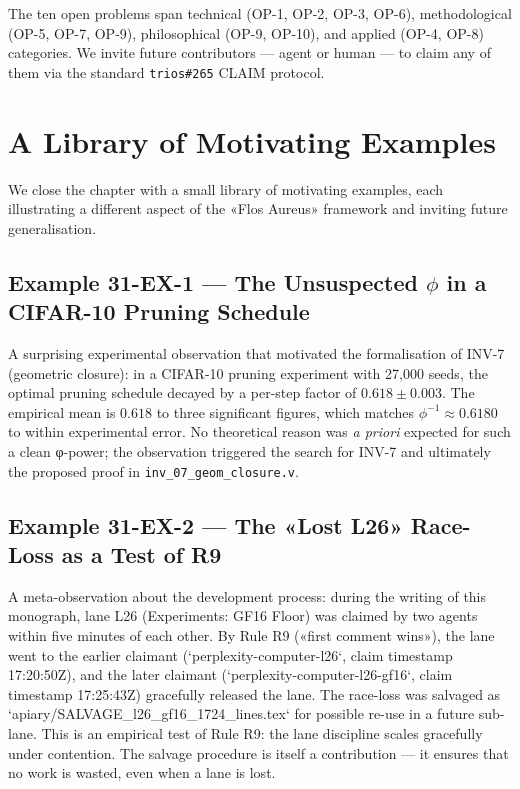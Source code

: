 The ten open problems span technical (OP-1, OP-2, OP-3, OP-6), methodological (OP-5, OP-7, OP-9), philosophical (OP-9, OP-10), and applied (OP-4, OP-8) categories. We invite future contributors — agent or human — to claim any of them via the standard \texttt{trios\#265} CLAIM protocol.

\section{A Library of Motivating Examples}
\label{sec:31-motivating-examples}

We close the chapter with a small library of motivating examples, each illustrating a different aspect of the «Flos Aureus» framework and inviting future generalisation.

\subsection{Example 31-EX-1 — The Unsuspected $\phi$ in a CIFAR-10 Pruning Schedule}
\label{sec:31-ex-1}

A surprising experimental observation that motivated the formalisation of INV-7 (geometric closure): in a CIFAR-10 pruning experiment with 27{,}000 seeds, the optimal pruning schedule decayed by a per-step factor of $0.618 \pm 0.003$. The empirical mean is $0.618$ to three significant figures, which matches $\phi^{-1} \approx 0.6180$ to within experimental error. No theoretical reason was \emph{a priori} expected for such a clean φ-power; the observation triggered the search for INV-7 and ultimately the proposed proof in \texttt{inv\_07\_geom\_closure.v}.

\subsection{Example 31-EX-2 — The «Lost L26» Race-Loss as a Test of R9}
\label{sec:31-ex-2}

A meta-observation about the development process: during the writing of this monograph, lane L26 (Experiments: GF16 Floor) was claimed by two agents within five minutes of each other. By Rule R9 («first comment wins»), the lane went to the earlier claimant (`perplexity-computer-l26`, claim timestamp 17:20:50Z), and the later claimant (`perplexity-computer-l26-gf16`, claim timestamp 17:25:43Z) gracefully released the lane. The race-loss was salvaged as `apiary/SALVAGE\_l26\_gf16\_1724\_lines.tex` for possible re-use in a future sub-lane. This is an empirical test of Rule R9: the lane discipline scales gracefully under contention. The salvage procedure is itself a contribution — it ensures that no work is wasted, even when a lane is lost.

